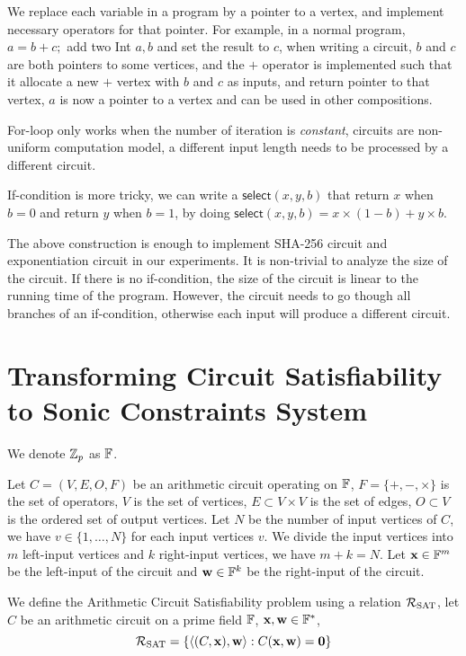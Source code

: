 We replace each variable in a program by a pointer to a vertex, and implement necessary operators for that pointer. For example, in a normal program, $a = b + c;$ add two Int $a, b$ and set the result to $c$, when writing a circuit, $b$ and $c$ are both pointers to some vertices, and the $+$ operator is implemented such that it allocate a new $+$ vertex with $b$ and $c$ as inputs, and return pointer to that vertex, $a$ is now a pointer to a vertex and can be used in other compositions.

For-loop only works when the number of iteration is \textit{constant}, circuits are non-uniform computation model, a different input length needs to be processed by a different circuit.

If-condition is more tricky, we can write a $\mathsf{select}(x, y, b)$ that return $x$ when $b = 0$ and return $y$ when $b = 1$, by doing $\mathsf{select}(x, y, b) = x \times (1 - b) + y \times b$.

The above construction is enough to implement SHA-256 circuit and exponentiation circuit in our experiments. It is non-trivial to analyze the size of the circuit. If there is no if-condition, the size of the circuit is linear to the running time of the program. However, the circuit needs to go though all branches of an if-condition, otherwise each input will produce a different circuit.

\section{Transforming Circuit Satisfiability to Sonic Constraints System}

We denote $\mathbb{Z}_p$ as $\mathbb{F}$.

\begin{definition}
Let $C = (V, E, O, F)$ be an arithmetic circuit operating on $\mathbb{F}$, $F = \{ +, -, \times \}$ is the set of operators, $V$ is the set of vertices, $E \subset V \times V$ is the set of edges, $O \subset V$ is the ordered set of output vertices. Let $N$ be the number of input vertices of $C$, we have $v \in \{1, \dots, N\}$ for each input vertices $v$. We divide the input vertices into $m$ left-input vertices and $k$ right-input vertices, we have $m+k=N$. Let $\mathbf{x} \in \mathbb{F}^m$ be the left-input of the circuit and $\mathbf{w} \in \mathbb{F}^k$ be the right-input of the circuit.

We define the Arithmetic Circuit Satisfiability problem using a relation $\mathcal{R}_{\mathrm{SAT}}$, let $C$ be an arithmetic circuit on a prime field $\mathbb{F}$, $\mathbf{x}, \mathbf{w} \in \mathbb{F}^*$,
$$\mathcal{R}_{\mathrm{SAT}} = \{ \langle (C, \mathbf{x}), \mathbf{w} \rangle : C(\mathbf{x}, \mathbf{w}) = \mathbf{0} \}$$
\end{definition}

